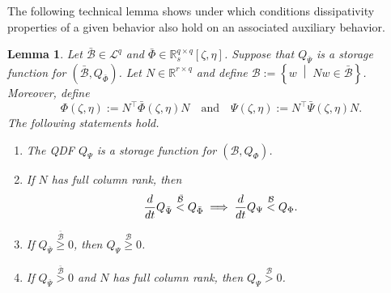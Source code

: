 \documentclass[letterpaper, 10 pt, conference]{ieeeconf}
\theoremstyle{ieeeconf}
\newtheorem{lemma}{Lemma}
\newcommand{\R}{\mathbb{R}}
\newcommand{\B}{\mathcal{B}}
\newcommand{\set}[2]{\left\{ #1 \;\middle| \; #2 \right\}}
\begin{document}
\appendix
The following technical lemma shows under which conditions dissipativity properties of a given behavior also hold on an associated auxiliary behavior.
\begin{lemma}
	Let $\bar{\mathcal{B}} \in \mathcal{L}^q$ and $\bar{\Phi} \in \R_s^{q \times q}[\zeta,\eta]$. Suppose that $Q_{\bar{\Psi}}$ is a storage function for $(\bar{\B},Q_{\bar{\Phi}})$. Let $N\in \R^{r \times q}$ and define $\B:=\set{w}{Nw \in \bar{\B}}$. Moreover, define
	\vspace{-0.5ex}
	\begin{equation*}
		\Phi(\zeta,\eta) := N^\top \bar{\Phi}(\zeta,\eta)N \quad \text{and} \quad \Psi(\zeta,\eta) := N^\top \bar{\Psi}(\zeta,\eta)N.
	\end{equation*}
	The following statements hold.
	\begin{enumerate}[label=\roman*)]
		\item The QDF $Q_\Psi$ is a storage function for $(\B,Q_{\Phi})$. \label{lemma stat 1}
		\item If $N$ has full column rank, then 
		\[\frac{d}{dt}Q_{\bar{\Psi}} \stackrel{\bar{\B}}{<}Q_{\bar{\Phi}} \implies \frac{d}{dt}Q_\Psi \stackrel{\B}{<}Q_\Phi. \vspace{-1.5ex}\] \label{lemma stat 2}
		\item If $Q_{\bar{\Psi}} \stackrel{\bar{\B}}{\geq}0$, then $Q_\Psi \stackrel{\B}{\geq}0$. \label{lemma stat 3}
		\item If $Q_{\bar{\Psi}} \stackrel{\bar{\B}}{>}0$ and $N$ has full column rank, then $Q_\Psi \stackrel{\B}{>}0$. \label{lemma stat 4}
	\end{enumerate}
	\label{lemma barB dissipativity}
\end{lemma}
\end{document}
